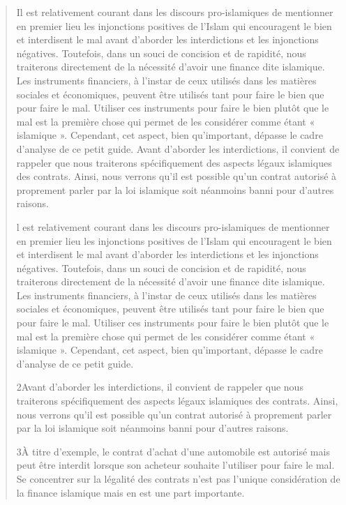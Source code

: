 \begin{quote}
    
Il est relativement courant dans les discours pro-islamiques de mentionner en premier lieu les injonctions positives de l’Islam qui encouragent le bien et interdisent le mal avant d’aborder les interdictions et les injonctions négatives. Toutefois, dans un souci de concision et de rapidité, nous traiterons directement de la nécessité d’avoir une finance dite islamique. Les instruments financiers, à l’instar de ceux utilisés dans les matières sociales et économiques, peuvent être utilisés tant pour faire le bien que pour faire le mal. Utiliser ces instruments pour faire le bien plutôt que le mal est la première chose qui permet de les considérer comme étant « islamique ». Cependant, cet aspect, bien qu’important, dépasse le cadre d’analyse de ce petit guide.
Avant d’aborder les interdictions, il convient de rappeler que nous traiterons spécifiquement des aspects légaux islamiques des contrats. Ainsi, nous verrons qu’il est possible qu’un contrat autorisé à proprement parler par la loi islamique soit néanmoins banni pour d’autres raisons.


l est relativement courant dans les discours pro-islamiques de mentionner en premier lieu les injonctions positives de l’Islam qui encouragent le bien et interdisent le mal avant d’aborder les interdictions et les injonctions négatives. Toutefois, dans un souci de concision et de rapidité, nous traiterons directement de la nécessité d’avoir une finance dite islamique. Les instruments financiers, à l’instar de ceux utilisés dans les matières sociales et économiques, peuvent être utilisés tant pour faire le bien que pour faire le mal. Utiliser ces instruments pour faire le bien plutôt que le mal est la première chose qui permet de les considérer comme étant « islamique ». Cependant, cet aspect, bien qu’important, dépasse le cadre d’analyse de ce petit guide.

2Avant d’aborder les interdictions, il convient de rappeler que nous traiterons spécifiquement des aspects légaux islamiques des contrats. Ainsi, nous verrons qu’il est possible qu’un contrat autorisé à proprement parler par la loi islamique soit néanmoins banni pour d’autres raisons.

3À titre d’exemple, le contrat d’achat d’une automobile est autorisé mais peut être interdit lorsque son acheteur souhaite l’utiliser pour faire le mal. Se concentrer sur la légalité des contrats n’est pas l’unique considération de la finance islamique mais en est une part importante.


\end{quote}
